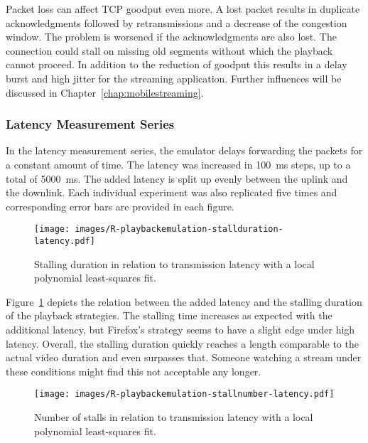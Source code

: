 Packet loss can affect \gls{TCP} goodput even more. A lost packet results in duplicate acknowledgments followed by retransmissions and a decrease of the congestion window. The problem is worsened if the acknowledgments are also lost. The connection could stall on missing old segments without which the playback cannot proceed. In addition to the reduction of goodput this results in a delay burst and high jitter for the streaming application. Further influences will be discussed in Chapter~\ref{chap:mobilestreaming}.


\subsubsection{Latency Measurement Series}

In the latency measurement series, the emulator delays forwarding the packets for a constant amount of time. The latency was increased in \SI{100}{\milli\second} steps, up to a total of \SI{5000}{\milli\second}. The added latency is split up evenly between the uplink and the downlink. Each individual experiment was also replicated five times and corresponding error bars are provided in each figure.

\begin{figure}[htbp]
	\centering
	\texttt{[image: images/R-playbackemulation-stallduration-latency.pdf]}
	\caption{Stalling duration in relation to transmission latency with a local polynomial least-squares fit.}
\label{c3:fig:eval-latency-stallingtime}
\end{figure}

Figure~\ref{c3:fig:eval-latency-stallingtime} depicts the relation between the added latency and the stalling duration of the playback strategies. The stalling time increases as expected with the additional latency, but Firefox's strategy seems to have a slight edge under high latency. Overall, the stalling duration quickly reaches a length comparable to the actual video duration and even surpasses that. Someone watching a stream under these conditions might find this not acceptable any longer.

\begin{figure}[htbp]
	\centering
	\texttt{[image: images/R-playbackemulation-stallnumber-latency.pdf]}
	\caption{Number of stalls in relation to transmission latency with a local polynomial least-squares fit.}
\label{c3:fig:eval-latency-numstalls}
\end{figure}

